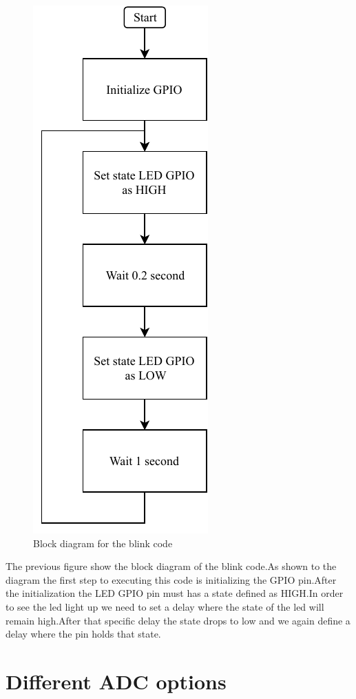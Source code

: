 \documentclass[a4paper, 11pt, openany, oneside]{book}
\begin{document}
\begin{figure}
\centering
\includegraphics{mbed_blink_diag.pdf}
\caption{Block diagram for the blink code}
\end{figure}

\newpage
The previous figure show the block diagram of the blink code.As shown to the diagram the first step to executing this code is initializing the GPIO pin.After the initialization the LED GPIO pin must has a state defined as HIGH.In order to see the led light up we need to set a delay where the state of the led will remain high.After that specific delay the state drops to low and we again define a delay where the pin holds that state.

\chapter{Different ADC options}
\end{document}
